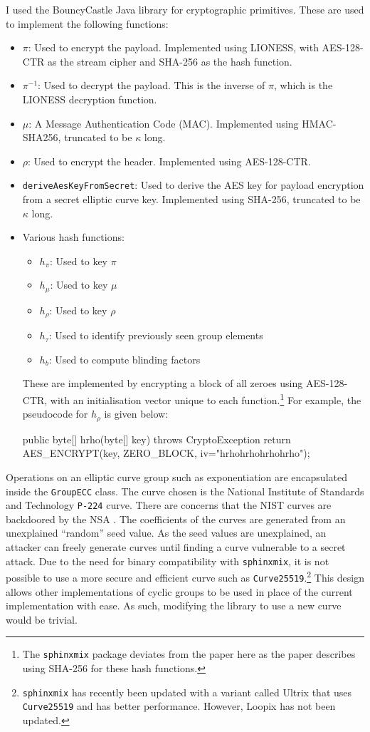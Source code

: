 \documentclass[final,dissertation.tex]{subfiles}
\begin{document}
I used the BouncyCastle Java library for cryptographic primitives. These are used to implement the following functions:

\begin{itemize}
	\item $\pi$: Used to encrypt the payload. Implemented using LIONESS, with AES-128-CTR as the stream cipher and SHA-256 as the hash function.
	\item $\pi^{-1}$: Used to decrypt the payload. This is the inverse of $\pi$, which is the LIONESS decryption function.
	\item $\mu$: A Message Authentication Code (MAC). Implemented using HMAC-SHA256, truncated to be $\kappa$ long.
	\item $\rho$: Used to encrypt the header. Implemented using AES-128-CTR.
	\item \verb|deriveAesKeyFromSecret|: Used to derive the AES key for payload encryption from a secret elliptic curve key. Implemented using SHA-256, truncated to be $\kappa$ long.
	\item Various hash functions:
		\begin{itemize}
			\item $h_\pi$: Used to key $\pi$
			\item $h_\mu$: Used to key $\mu$
			\item $h_\rho$: Used to key $\rho$
			\item $h_\tau$: Used to identify previously seen group elements
			\item $h_b$: Used to compute blinding factors
		\end{itemize}
		These are implemented by encrypting a block of all zeroes using AES-128-CTR, with an initialisation vector unique to each function.\footnote{The \verb|sphinxmix| package deviates from the paper here as the paper describes using SHA-256 for these hash functions.} For example, the pseudocode for $h_\rho$ is given below:
		\begin{javacode}
public byte[] hrho(byte[] key) throws CryptoException {
    return AES_ENCRYPT(key, ZERO_BLOCK, iv="hrhohrhohrhohrho");
}
		\end{javacode}
\end{itemize}

Operations on an elliptic curve group such as exponentiation are encapsulated inside the \verb|GroupECC| class. The curve chosen is the National Institute of Standards and Technology \verb|P-224| curve. There are concerns that the NIST curves are backdoored by the NSA \cite{safecurves}. The coefficients of the curves are generated from an unexplained ``random'' seed value. As the seed values are unexplained, an attacker can freely generate curves until finding a curve vulnerable to a secret attack. Due to the need for binary compatibility with \verb|sphinxmix|, it is not possible to use a more secure and efficient curve such as \verb|Curve25519|.\footnote{\verb|sphinxmix| has recently been updated with a variant called Ultrix that uses \verb|Curve25519| and has better performance. However, Loopix has not been updated.} This design allows other implementations of cyclic groups to be used in place of the current implementation with ease. As such, modifying the library to use a new curve would be trivial.
\end{document}
